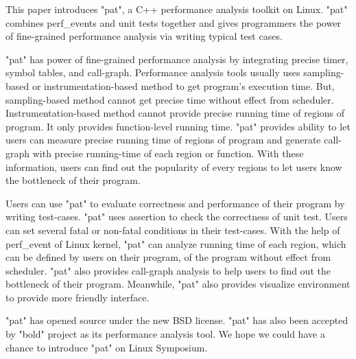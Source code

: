This paper introduces "pat", a C++ performance analysis toolkit on Linux.
"pat" combines perf_events and unit tests together and gives programmers the power of fine-grained performance analysis via writing typical test cases.

"pat" has power of fine-grained performance analysis by integrating precise timer, symbol tables, and call-graph.
Performance analysis tools usually uses sampling-based or instrumentation-based method to get program's execution time.
But, sampling-based method cannot get precise time without effect from scheduler.
Instrumentation-based method cannot provide precise running time of regions of program.
It only provides function-level running time. 
"pat" provides ability to let users can measure precise running time of regions of program and generate call-graph with precise running-time of each region or function. 
With these information, users can find out the popularity of every regions to let users know the bottleneck of their program.

Users can use "pat" to evaluate correctness and performance of their program by writing test-cases.
"pat" uses assertion to check the correctness of unit test. 
Users can set several fatal or non-fatal conditions in their test-cases.
With the help of perf_event of Linux kernel, "pat" can analyze running time of each region, which can be defined by users on their program, of the program without effect from scheduler. 
"pat" also provides call-graph analysis to help users to find out the bottleneck of their program. 
Meanwhile, "pat" also provides visualize environment to provide more friendly interface.

"pat" has opened source under the new BSD license. 
"pat" has also been accepted by "bold" project as its performance analysis tool.
We hope we could have a chance to introduce "pat" on Linux Symposium.
